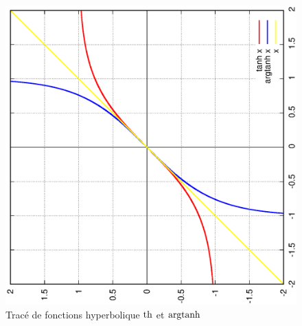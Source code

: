 %
\begin{figure}
  \centering
  \includegraphics[scale=0.4,angle=-90]{argtanh.ps}
  \caption{Tracé de fonctions hyperbolique $\operatorname{th}$ et $\operatorname{argtanh}$}
  \label{fig:tracetanhargth}
\end{figure}
